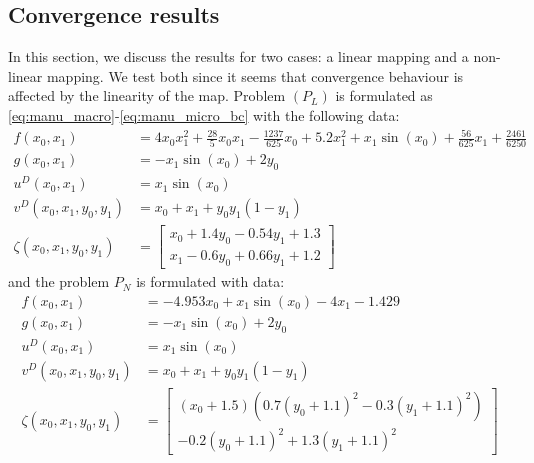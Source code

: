 \documentclass{article}
\begin{document}
\subsection{Convergence results}

In this section, we discuss the results for two cases: a linear mapping and a non-linear mapping.
We test both since it seems that convergence behaviour is affected by the linearity of the map.
Problem $(P_L)$ is formulated as \eqref{eq:manu_macro}-\eqref{eq:manu_micro_bc} with the following data:
\begin{equation}
    \begin{split}
        f(x_0,x_1) &= 4x_0x_1^2 + \frac{28}{5}x_0x_1 - \frac{1237}{625}x_0 + 5.2x_1^2 + x_1\sin(x_0) + \frac{56}{625}x_1 + \frac{2461}{6250}\\
        g(x_0,x_1) &= -x_1\sin(x_0) + 2y_0\\
        u^D(x_0,x_1) &= x_1\sin(x_0)\\
        v^D(x_0,x_1,y_0,y_1) &= x_0 + x_1 + y_0y_1(1-y_1)\\
        \zeta(x_0,x_1,y_0,y_1) &= \begin{bmatrix}
            x_0 + 1.4y_0 - 0.54y_1 + 1.3\\
            x_1 - 0.6y_0 + 0.66y_1 + 1.2
        \end{bmatrix}
    \end{split}
\end{equation}
and the problem $P_{N}$ is formulated with data:
\begin{equation}
    \begin{split}
        f(x_0,x_1) &= -4.953 x_0 + x_1\sin(x_0) - 4x_1 - 1.429\\
        g(x_0,x_1) &= -x_1\sin(x_0) + 2y_0\\
        u^D(x_0,x_1) &= x_1\sin(x_0)\\
        v^D(x_0,x_1,y_0,y_1) &= x_0 + x_1 + y_0y_1(1-y_1)\\
        \zeta(x_0,x_1,y_0,y_1) &= \begin{bmatrix}
            (x_0 + 1.5)\left(0.7(y_0 + 1.1)^2 - 0.3(y_1 + 1.1)^2\right)\\
            -0.2(y_0 + 1.1)^2 + 1.3(y_1 + 1.1)^2
        \end{bmatrix}
    \end{split}
\end{equation}
\end{document}
